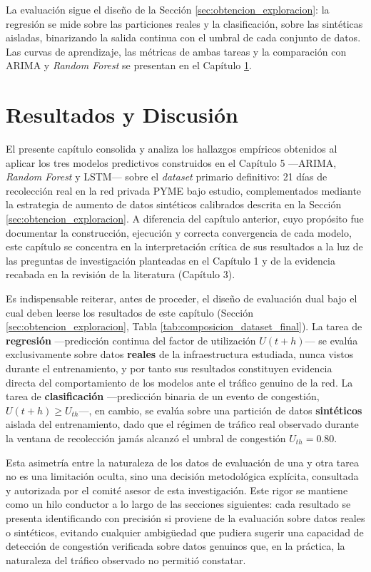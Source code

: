 \documentclass[12pt]{report}
\begin{document}
La evaluación sigue el diseño de la Sección \ref{sec:obtencion_exploracion}: la regresión se mide sobre las particiones reales y la clasificación, sobre las sintéticas aisladas, binarizando la salida continua con el umbral de cada conjunto de datos. Las curvas de aprendizaje, las métricas de ambas tareas y la comparación con ARIMA y \textit{Random Forest} se presentan en el Capítulo \ref{cap:resultados}.

\chapter{Resultados y Discusión}
\label{cap:resultados}

El presente capítulo consolida y analiza los hallazgos empíricos obtenidos al aplicar los tres modelos predictivos construidos en el Capítulo 5 ---ARIMA, \textit{Random Forest} y LSTM--- sobre el \textit{dataset} primario definitivo: 21 días de recolección real en la red privada PYME bajo estudio, complementados mediante la estrategia de aumento de datos sintéticos calibrados descrita en la Sección \ref{sec:obtencion_exploracion}. A diferencia del capítulo anterior, 
cuyo propósito fue documentar la construcción, ejecución y correcta convergencia de cada modelo, este capítulo se concentra en la interpretación crítica de sus resultados a la luz de las preguntas de investigación planteadas en el Capítulo 1 y de la evidencia recabada en la revisión de la literatura (Capítulo 3).

Es indispensable reiterar, antes de proceder, el diseño de evaluación dual bajo el cual deben leerse los resultados de este capítulo (Sección \ref{sec:obtencion_exploracion}, Tabla \ref{tab:composicion_dataset_final}). La tarea de \textbf{regresión} ---predicción continua del factor de utilización $U(t+h)$--- se evalúa exclusivamente sobre datos \textbf{reales} de la infraestructura estudiada, nunca vistos durante el entrenamiento, y por tanto sus resultados constituyen 
evidencia directa del comportamiento de los modelos ante el tráfico genuino de la red. La tarea de \textbf{clasificación} ---predicción binaria de un evento de congestión, $U(t+h) \geq U_{th}$---, en cambio, se evalúa sobre una partición de datos \textbf{sintéticos} aislada del entrenamiento, dado que el régimen de tráfico real observado durante la ventana de recolección jamás alcanzó el umbral de congestión $U_{th}=0.80$. 

Esta asimetría entre la naturaleza de los datos de evaluación de una y otra tarea no es una limitación oculta, sino una decisión metodológica explícita, consultada y autorizada por el comité asesor de esta investigación. Este rigor se mantiene como un hilo conductor a lo largo de las secciones siguientes: cada resultado se presenta identificando con precisión si proviene de la evaluación sobre datos reales o sintéticos, evitando cualquier ambigüedad que pudiera sugerir una 
capacidad de detección de congestión verificada sobre datos genuinos que, en la práctica, la naturaleza del tráfico observado no permitió constatar.
\end{document}
